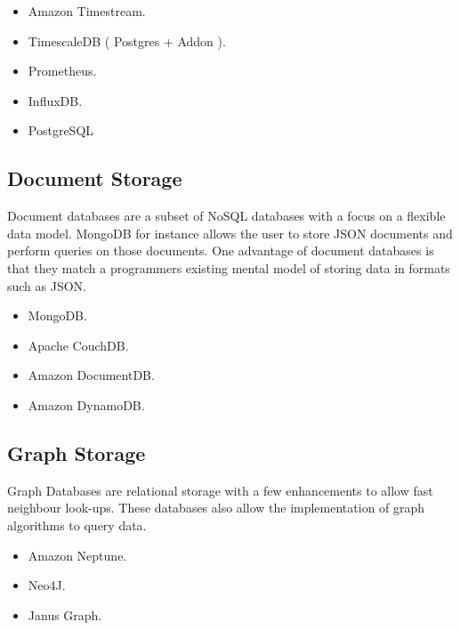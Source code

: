 \documentclass{csse4400}
\begin{document}
\begin{itemize}
  \item Amazon Timestream.
  \item TimescaleDB ( Postgres + Addon ).
  \item Prometheus.
  \item InfluxDB.
  \item PostgreSQL
\end{itemize}

\subsection{Document Storage}

Document databases are a subset of NoSQL databases with a focus on a flexible data model.
MongoDB for instance allows the user to store JSON documents and perform queries on those documents.
One advantage of document databases is that they match a programmers existing mental model of storing data in formats such as JSON.

\begin{itemize}
  \item MongoDB.
  \item Apache CouchDB.
  \item Amazon DocumentDB.
  \item Amazon DynamoDB.
\end{itemize}

\subsection{Graph Storage}


Graph Databases are relational storage with a few enhancements to allow fast neighbour look-ups.
These databases also allow the implementation of graph algorithms to query data.

\begin{itemize}
  \item Amazon Neptune.
  \item Neo4J.
  \item Janus Graph.
\end{itemize}
\end{document}
